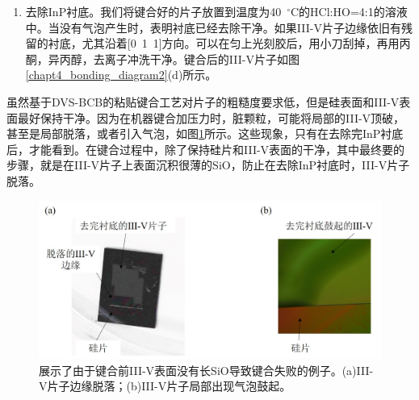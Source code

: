 \begin{enumerate}[(1)]
	\item 去除InP衬底。我们将键合好的片子放置到温度为40~$^{\circ}$C的HCl:HO=4:1的溶液中。当没有气泡产生时，表明衬底已经去除干净。如果III-V片子边缘依旧有残留的衬底，尤其沿着[0~1~1]方向。可以在匀上光刻胶后，用小刀刮掉，再用丙酮，异丙醇，去离子冲洗干净。键合后的III-V片子如图\ref{chapt4_bonding_diagram2}(d)所示。
\end{enumerate}	

虽然基于DVS-BCB的粘贴键合工艺对片子的粗糙度要求低，但是硅表面和III-V表面最好保持干净。因为在机器键合加压力时，脏颗粒，可能将局部的III-V顶破，甚至是局部脱落，或者引入气泡，如图\ref{chapt4_bonding_error}所示。这些现象，只有在去除完InP衬底后，才能看到。在键合过程中，除了保持硅片和III-V表面的干净，其中最终要的步骤，就是在III-V片子上表面沉积很薄的SiO，防止在去除InP衬底时，III-V片子脱落。
\begin{figure}[htb]
	\centering
	\includegraphics[width=14cm]{./Pictures/chapt4_bonding_error.jpg}
	\caption{展示了由于键合前III-V表面没有长SiO导致键合失败的例子。(a)III-V片子边缘脱落；(b)III-V片子局部出现气泡鼓起。}
	\label{chapt4_bonding_error}
\end{figure}
